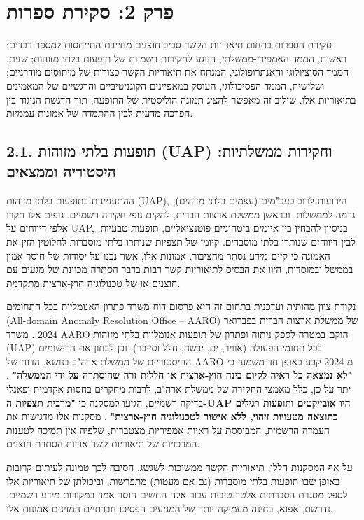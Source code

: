 \documentclass[12pt,a4paper]{article}
\begin{document}
\section{פרק 2: סקירת ספרות}
סקירת הספרות בתחום תיאוריות הקשר סביב חוצנים מחייבת התייחסות למספר רבדים: ראשית, הממד האמפירי-ממשלתי, הנוגע לחקירות רשמיות של תופעות בלתי מזוהות; שנית, הממד הסוציולוגי והאנתרופולוגי, המנתח את תיאוריות הקשר כצורות של מיתוסים מודרניים; ושלישית, הממד הפסיכולוגי, העוסק במאפיינים הקוגניטיביים והרגשיים של המאמינים בתיאוריות אלו. שילוב זה מאפשר להציג תמונה הוליסטית של התופעה, תוך הדגשת הניגוד בין הפרכה מדעית לבין ההתמדה של אמונות עממיות.

\subsection{2.1. תופעות בלתי מזוהות (UAP) וחקירות ממשלתיות: היסטוריה וממצאים}
ההתעניינות בתופעות בלתי מזוהות (UAP), הידועות לרוב כעב"מים (עצמים בלתי מזוהים), גרמה לממשלות, ובראשן ממשלת ארצות הברית, להקים גופי חקירה רשמיים. גופים אלו חקרו אלפי דיווחים על UAP, בניסיון להבחין בין איומים ביטחוניים פוטנציאליים, תופעות טבעיות, לבין דיווחים שנותרו בלתי מוסברים. קיומן של תצפיות שנותרו בלתי מוסברות לחלוטין הזין את האמונה כי קיים מידע נסתר מהציבור. אמונות אלו, אשר נבנו על יסודות של חוסר אמון בממשל ובמוסדות, היוו את הבסיס לתיאוריות קשר רבות בדבר הסתרה מכוונת של מגעים עם חוצנים או של טכנולוגיה חוץ-ארצית מתקדמת.

נקודת ציון מהותית ועדכנית בתחום זה היא פרסום דוח משרד פתרון האנומליות בכל התחומים (All-domain Anomaly Resolution Office – AARO) של ממשלת ארצות הברית בפברואר 2024 \cite{1, 2, 6}. משרד AARO הוקם במטרה לספק ניתוח ופתרון של תופעות אנומליות בלתי מזוהות (UAP) בכל תחומי הפעולה (אוויר, ים, יבשה, חלל וסייבר), וכן לבחון את הרישומים ההיסטוריים של ממשלת ארה"ב בנושא. הדוח של AARO מ-2024 קבע באופן חד-משמעי כי \textbf{"לא נמצאה כל ראיה לקיום בינה חוץ-ארצית או חללית זרה שהוסתרה על ידי הממשלה"} \cite{1, 6}. יתר על כן, כלל מאמצי החקירה של ממשלת ארה"ב, לרבות מחקרים בחסות אקדמית ופאנלי בדיקה רשמיים, הגיעו למסקנה כי \textbf{"מרבית תצפיות ה-UAP היו אובייקטים ותופעות רגילים כתוצאה מטעויות זיהוי, ללא אישור לטכנולוגיה חוץ-ארצית"} \cite{2, 6}. מסקנות אלו מדגישות את העמדה הרשמית, המבוססת על ראיות אמפיריות מצטברות, שלפיה אין תמיכה לטענות המרכזיות של תיאוריות קשר אודות הסתרת חוצנים.

על אף המסקנות הללו, תיאוריות הקשר ממשיכות לשגשג. הסיבה לכך טמונה לעיתים קרובות באופן שבו תופעות בלתי מוסברות (גם אם מעטות) מתפרשות, וביכולתן של תיאוריות אלו לספק מסגרת הסברתית אלטרנטיבית עבור אלה החשים חוסר אמון במקורות מידע רשמיים. נדרשת, אפוא, בחינה מעמיקה יותר של המניעים הפסיכו-חברתיים המזינים אמונות אלו.
\end{document}
